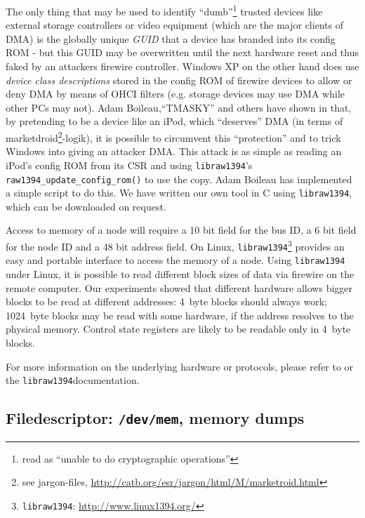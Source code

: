 The only thing that may be used to identify ``dumb''\footnote{read as ``unable
to do cryptographic operations''} trusted devices like external storage
controllers or video equipment (which are the major clients of DMA) is the
globally unique \emph{GUID} that a device has branded into its config ROM - but
this GUID may be overwritten until the next hardware reset and thus faked by an
attackers firewire controller. Windows XP on the other hand does use
\emph{device class descriptions} stored in the config ROM of firewire devices to
allow or deny DMA by means of OHCI filters (e.g.  storage devices may use DMA
while other PCs may not). Adam Boileau,``TMASKY'' and others have shown in
\cite{rux2k6firewire:2006} that, by pretending to be a device like an iPod,
which ``deserves'' DMA (in terms of marketdroid\footnote{see jargon-files,
\href{http://catb.org/esr/jargon/html/M/marketroid.html}
{http://catb.org/esr/jargon/html/M/marketroid.html}}-logik), it is possible to
circumvent this ``protection'' and to trick Windows into giving an attacker DMA.
This attack is as simple as reading an iPod's config ROM from its CSR and using
\texttt{libraw1394}'s \texttt{raw1394\_update\_config\_rom()} to use the copy.
Adam Boileau has implemented a simple script to do this. We have written our own
tool in C using \texttt{libraw1394}, which can be downloaded on request.


Access to memory of a node will require a 10 bit field for the bus ID, a 6 bit
field for the node ID and a 48 bit address field.  On Linux,
\texttt{libraw1394}\footnote{\texttt{libraw1394}:
\href{http://www.linux1394.org/}{http://www.linux1394.org/}} provides an easy
and portable interface to access the memory of a node.  Using
\texttt{libraw1394} under Linux, it is possible to read different block sizes of
data via firewire on the remote computer. Our experiments showed that different
hardware allows bigger blocks to be read at different addresses: 4~byte blocks
should always work; 1024~byte blocks may be read with some hardware, if the
address resolves to the physical memory. Control state registers are likely to
be readable only in 4~byte blocks.


For more information on the underlying hardware or protocols, please refer to
\cite{OHCIspecs:2000,fwire_sys_arch:2222} or the
\texttt{libraw1394}\footnotemark[\value{footnote}] documentation.





\subsection{Filedescriptor: \texttt{/dev/mem}, memory dumps}

